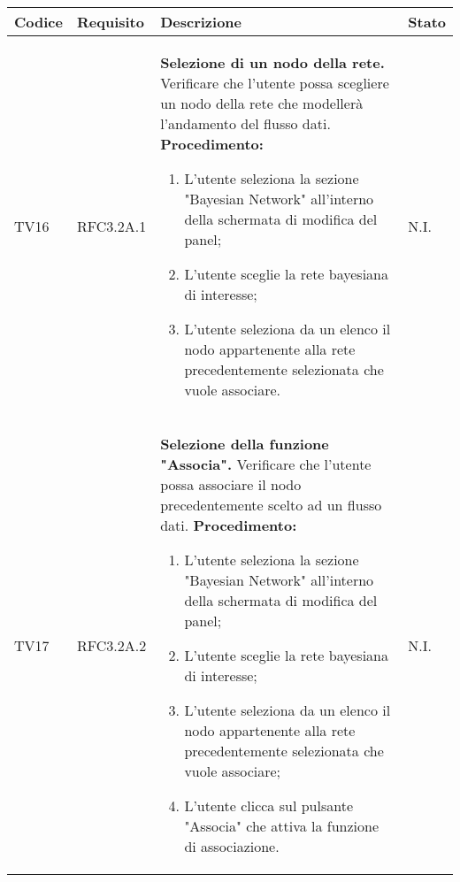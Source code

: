 \begin{table}[!htpb]
	\centering
	\renewcommand{\arraystretch}{2} 
	\begin{tabular}{|l|l|p{10cm}|l|}
		\rowcolor{orange!50}
		\hline
		\textbf{Codice} & \textbf{Requisito}& \textbf{Descrizione} & \textbf{Stato}\\ 
		\hline
		TV16 & RFC3.2A.1 &
			\textbf{Selezione di un nodo della rete.}
			\newline
			Verificare che l'utente possa scegliere un nodo della rete che modellerà l’andamento del flusso dati.
			\newline
			\textbf{Procedimento:}
			\begin{enumerate}
				\item L’utente seleziona la sezione "Bayesian Network" all'interno della schermata di modifica del panel; 
				\item L'utente sceglie la rete bayesiana di interesse;
				\item L’utente seleziona da un elenco il nodo appartenente alla rete precedentemente selezionata che vuole associare.
			\end{enumerate} 
			& N.I.\\
		\hline		
		TV17 & RFC3.2A.2 &
			\textbf{Selezione della funzione "Associa".}
			\newline
			Verificare che l'utente possa associare il nodo precedentemente scelto ad un flusso dati.
			\newline
			\textbf{Procedimento:}
			\begin{enumerate}
				\item L’utente seleziona la sezione "Bayesian Network" all'interno della schermata di modifica del panel; 
				\item L'utente sceglie la rete bayesiana di interesse;
				\item L’utente seleziona da un elenco il nodo appartenente alla rete precedentemente selezionata che vuole associare;
				\item L’utente clicca sul pulsante "Associa" che attiva la funzione di associazione.
			\end{enumerate} 
			& N.I.\\
		\hline
	\end{tabular}
\end{table}

